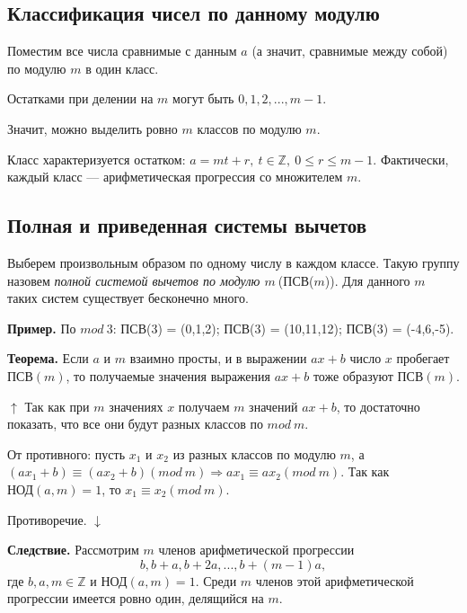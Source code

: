 \documentclass{article}
\begin{document}
        \subsection{Классификация чисел по данному модулю}
        	Поместим все числа сравнимые с данным \(a\) (а значит, сравнимые между собой) по модулю \(m\) в один класс.

            Остатками при делении на \(m\) могут быть \(0,1,2,...,m - 1\).

            Значит, можно выделить ровно \(m\) классов по модулю \(m\).

            Класс характеризуется остатком: \( a = mt + r,\ t \in \mathbb{Z},\ 0 \leq r \leq m - 1 \). Фактически, каждый класс --- арифметическая прогрессия со множителем \(m\).
            
        \subsection{Полная и приведенная системы вычетов}
        	Выберем произвольным образом по одному числу в каждом классе. Такую группу назовем \textit{полной системой вычетов по модулю \(m\ \)}(ПСВ(\(m\))). Для данного \(m\) таких систем существует бесконечно много.

            \textbf{Пример.} По \(mod\ 3\): ПСВ(3) = (0,1,2); ПСВ(3) = (10,11,12); ПСВ(3) = (-4,6,-5).
            
            \textbf{Теорема.} Если $a$ и $m$ взаимно просты, и в выражении $ax + b$ число $x$ пробегает $\textrm{ПСВ}(m)$, то получаемые значения выражения $ax + b$ тоже образуют $\textrm{ПСВ}(m)$.
            
      		$\uparrow$ Так как при $m$ значениях $x$ получаем $m$ значений $ax + b$, то достаточно показать, что все они будут разных классов по $mod\ m$.
            
            От противного: пусть $x_1$ и $x_2$ из разных классов по модулю $m$, а $(ax_1 + b) \equiv (ax_2 + b)(mod\ m) \Rightarrow ax_1 \equiv ax_2(mod\ m)$. Так как $\textrm{НОД}(a,m) = 1$, то $x_1 \equiv x_2(mod\ m)$.
            
            Противоречие. $\downarrow$
            
            \textbf{Следствие.} Рассмотрим $m$ членов арифметической прогрессии 
            \[ b, b + a, b + 2a, ..., b + (m - 1)a, \]
            где $b,a,m \in \mathbb{Z}$ и $\textrm{НОД}(a,m) = 1$. Среди $m$ членов этой арифметической прогрессии имеется ровно один, делящийся на $m$.
            
\end{document}
